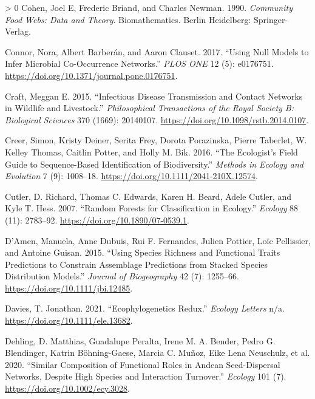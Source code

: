 \documentclass[11pt]{article}
\newlength{\cslhangindent}
\newenvironment{CSLReferences}[3] %
 {%
  \setlength{\parindent}{0pt}
  \ifodd #1 \everypar{\setlength{\hangindent}{\cslhangindent}}\ignorespaces\fi
  \ifnum #2 > 0
  \setlength{\parskip}{#2\baselineskip}
  \fi
 }%
 {}
\begin{document}
\begin{CSLReferences}{1}{0}
\leavevmode\hypertarget{ref-Cohen1990ComFoo}{}%
Cohen, Joel E, Frederic Briand, and Charles Newman. 1990.
\emph{Community Food Webs: Data and Theory}. Biomathematics. Berlin
Heidelberg: Springer-Verlag.

\leavevmode\hypertarget{ref-Connor2017UsiNul}{}%
Connor, Nora, Albert Barberán, and Aaron Clauset. 2017. {``Using Null
Models to Infer Microbial Co-Occurrence Networks.''} \emph{PLOS ONE} 12
(5): e0176751. \url{https://doi.org/10.1371/journal.pone.0176751}.

\leavevmode\hypertarget{ref-Craft2015InfDis}{}%
Craft, Meggan E. 2015. {``Infectious Disease Transmission and Contact
Networks in Wildlife and Livestock.''} \emph{Philosophical Transactions
of the Royal Society B: Biological Sciences} 370 (1669): 20140107.
\url{https://doi.org/10.1098/rstb.2014.0107}.

\leavevmode\hypertarget{ref-Creer2016EcoSF}{}%
Creer, Simon, Kristy Deiner, Serita Frey, Dorota Porazinska, Pierre
Taberlet, W. Kelley Thomas, Caitlin Potter, and Holly M. Bik. 2016.
{``The Ecologist's Field Guide to Sequence-Based Identification of
Biodiversity.''} \emph{Methods in Ecology and Evolution} 7 (9):
1008--18. \url{https://doi.org/10.1111/2041-210X.12574}.

\leavevmode\hypertarget{ref-Cutler2007RanFor}{}%
Cutler, D. Richard, Thomas C. Edwards, Karen H. Beard, Adele Cutler, and
Kyle T. Hess. 2007. {``Random Forests for Classification in Ecology.''}
\emph{Ecology} 88 (11): 2783--92.
\url{https://doi.org/10.1890/07-0539.1}.

\leavevmode\hypertarget{ref-DAmen2015UsiSpe}{}%
D'Amen, Manuela, Anne Dubuis, Rui F. Fernandes, Julien Pottier, Loïc
Pellissier, and Antoine Guisan. 2015. {``Using Species Richness and
Functional Traits Predictions to Constrain Assemblage Predictions from
Stacked Species Distribution Models.''} \emph{Journal of Biogeography}
42 (7): 1255--66. \url{https://doi.org/10.1111/jbi.12485}.

\leavevmode\hypertarget{ref-Davies2021EcoRed}{}%
Davies, T. Jonathan. 2021. {``Ecophylogenetics Redux.''} \emph{Ecology
Letters} n/a. \url{https://doi.org/10.1111/ele.13682}.

\leavevmode\hypertarget{ref-Dehling2020SimCom}{}%
Dehling, D. Matthias, Guadalupe Peralta, Irene M. A. Bender, Pedro G.
Blendinger, Katrin Böhning-Gaese, Marcia C. Muñoz, Eike Lena Neuschulz,
et al. 2020. {``Similar Composition of Functional Roles in Andean
Seed-Dispersal Networks, Despite High Species and Interaction
Turnover.''} \emph{Ecology} 101 (7).
\url{https://doi.org/10.1002/ecy.3028}.


\end{CSLReferences}
\end{document}
